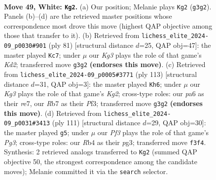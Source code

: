 \documentclass[11pt]{article}
\begin{document}
\clearpage

\begin{figure}[p]\centering
\begin{subfigure}{0.46\textwidth}\centering
\resizebox{\linewidth}{!}{%
\newchessgame
\chessboard[
  setfen={8/1R3p2/p3pk2/8/PR2P3/5PKP/8/r7 w - - 4 49},
  showmover=false,
  pgfstyle=straightmove, color=movearrow, markmove={g3-g2}
]}
\caption{}
\end{subfigure}\hfill
\begin{subfigure}{0.46\textwidth}\centering
\resizebox{\linewidth}{!}{%
\newchessgame
\chessboard[
  setfen={7R/1p1k1r2/2p2rp1/7p/4P3/4KPR1/1P6/8 b - - 4 41},
  showmover=false,
  pgfstyle=straightmove, color=movearrow, markmove={d7-c7}
]}
\caption{}
\end{subfigure}
\\[4pt]
\begin{subfigure}{0.46\textwidth}\centering
\resizebox{\linewidth}{!}{%
\newchessgame
\chessboard[
  setfen={8/4R1k1/6p1/6p1/2r5/2r2p1P/6PK/8 b - - 1 57},
  showmover=false,
  pgfstyle=straightmove, color=movearrow, markmove={g7-h6}
]}
\caption{}
\end{subfigure}\hfill
\begin{subfigure}{0.46\textwidth}\centering
\resizebox{\linewidth}{!}{%
\newchessgame
\chessboard[
  setfen={8/6k1/R4pp1/5r1p/7P/6P1/5PK1/8 b - - 25 56},
  showmover=false,
  pgfstyle=straightmove, color=movearrow, markmove={g6-g5}
]}
\caption{}
\end{subfigure}
\caption{\textbf{Move 49, White: \texttt{Kg2}.} (a) Our position; Melanie plays \texttt{Kg2} (\texttt{g3g2}). Panels (b)--(d) are the retrieved master positions whose correspondence most drove this move (highest QAP objective among those that transfer to it). (b) Retrieved from \texttt{lichess\_elite\_2024-09\_p0030\#901} (ply 81) [structural distance $d$=25, QAP obj=47]: the master played \texttt{Kc7}; under $\mu$ our \emph{Kg3} plays the role of that game's \emph{Kd2}; transferred move \texttt{g3g2} \textbf{(endorses this move)}. (c) Retrieved from \texttt{lichess\_elite\_2024-09\_p0005\#3771} (ply 113) [structural distance $d$=31, QAP obj=3]: the master played \texttt{Kh6}; under $\mu$ our \emph{Kg3} plays the role of that game's \emph{Kg2}; cross-type roles: our \emph{p}a6 as their \emph{r}e7, our \emph{R}b7 as their \emph{P}f3; transferred move \texttt{g3g2} \textbf{(endorses this move)}. (d) Retrieved from \texttt{lichess\_elite\_2024-09\_p0031\#3413} (ply 111) [structural distance $d$=29, QAP obj=30]: the master played \texttt{g5}; under $\mu$ our \emph{Pf3} plays the role of that game's \emph{Pg3}; cross-type roles: our \emph{R}b4 as their \emph{p}g3; transferred move \texttt{f3f4}. Synthesis: 2 retrieved analogs transferred to \texttt{Kg2} (summed QAP objective 50, the strongest correspondence among the candidate moves); Melanie committed it via the \texttt{search} selector.}
\label{fig:thought-m96}
\end{figure}
\end{document}
